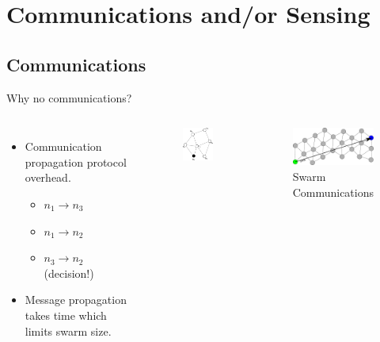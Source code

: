 \documentclass{beamer}
\begin{document}
\section{Communications and/or Sensing}
\subsection{Communications}
\begin{frame}{Why no communications?}
  
  \begin{columns}
      \begin{itemize}
        \item {
          Communication propagation protocol overhead.
          \begin{itemize}
            \item $n_1 \rightarrow n_3$
            \item $n_1 \rightarrow n_2$
            \item $n_3 \rightarrow n_2$ (decision!) 
          \end{itemize}
        }
        \item {   
          Message propagation takes time which limits swarm size.
        }
      \end{itemize}
      \begin{figure}
        \begin{center}
          \includegraphics[width=2.5cm]{MessagePropogation1.pdf}
        \end{center}
      \end{figure}
      \begin{figure}
        \begin{center}
          \includegraphics[width=4cm]{Comms1.pdf}
        \end{center}
        \caption{Swarm Communications}
      \end{figure}
    \end{columns}
\end{frame}
\end{document}
